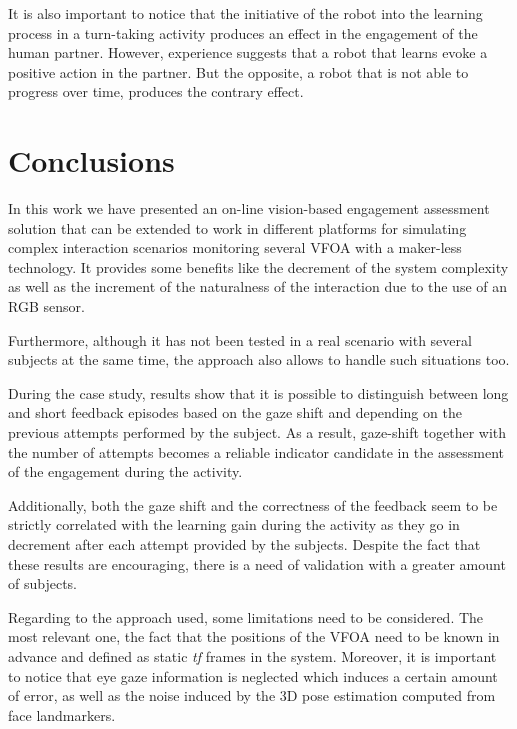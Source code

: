 \documentclass{sig-alternate}
\begin{document}
It is also important to notice that the initiative of the robot into the
learning process in a turn-taking activity produces an effect in the engagement
of the human partner. However, experience suggests that a robot that learns
evoke a positive action in the partner. But the opposite, a robot that is not
able to progress over time, produces the contrary effect.



\section{Conclusions}
In this work we have presented an on-line vision-based engagement assessment
solution that can be extended to work in different platforms for simulating
complex interaction scenarios monitoring several VFOA with a maker-less
technology. It provides some benefits like the decrement of the system
complexity as well as the increment of the naturalness of the interaction due to
the use of an RGB sensor.  

Furthermore, although it has not been tested in a real scenario with several
subjects at the same time, the approach also allows to handle such situations
too.

During the case study, results show that it is possible to distinguish between
long and short feedback episodes based on the gaze shift and depending on the
previous attempts performed by the subject. As a result, gaze-shift together
with the number of attempts becomes a reliable indicator candidate in the
assessment of the engagement during the activity.

Additionally, both the gaze shift and the correctness of the feedback seem to be
strictly correlated with the learning gain during the activity as they go in
decrement after each attempt provided by the subjects. Despite the fact that
these results are encouraging, there is a need of validation with a greater
amount of subjects.

Regarding to the approach used, some limitations need to be considered. The most
relevant one, the fact that the positions of the VFOA need to be known in
advance and defined as static \textit{tf} frames in the system. Moreover, it is
important to notice that eye gaze information is neglected which induces a
certain amount of error, as well as the noise induced by the 3D pose estimation
computed from face landmarkers.
\end{document}

